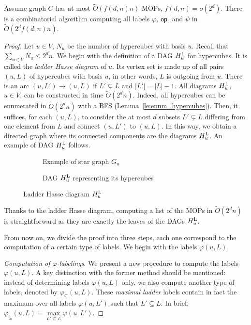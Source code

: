 \documentclass[a4paper,UKenglish,numberwithinsect,cleveref, autoref]{lipics-v2021}
\newcommand{\card}[1]{\left| #1 \right|}
\newcommand{\opp}{\mbox{\textsf{op}}}
\newcommand{\hul}{H_u^{\mbox{\scriptsize{L}}}}
\newcommand{\varphis}{\varphi_{\subseteq}}
\begin{document}
\begin{theorem}
Assume graph $G$ has at most $\tilde{O}(f(d,n)n)$ MOPs, $f(d,n) = o(2^d)$. There is a combinatorial algorithm computing all labels $\varphi$, $\opp$, and $\psi$ in $\tilde{O}(2^df(d,n)n)$.
\label{th:labels_mops}
\end{theorem}
\begin{proof}
Let $u \in V$, $N_u$ be the number of hypercubes with basis $u$. 
Recall that $\sum_{u \in V} N_u \le 2^dn$. We begin with the definition of a DAG $\hul$ for hypercubes. It is called the \textit{ladder Hasse diagram} of $u$. Its vertex set is made up of all pairs $(u,L)$ of hypercubes with basis $u$, in other words, $L$ is outgoing from $u$. There is an arc $(u,L')\rightarrow (u,L)$ if $L' \subsetneq L$ and $\card{L'} = \card{L} - 1$. All diagrams $\hul$, $u \in V$, can be constructed in time $\tilde{O}(2^dn)$. Indeed, all hypercubes can be enumerated in $\tilde{O}(2^dn)$ with a BFS (Lemma~\ref{le:enum_hypercubes}). Then, it suffices, for each $(u,L)$, to consider the at most $d$ subsets $L' \subsetneq L$ differing from one element from $L$ and connect $(u,L')$ to $(u,L)$. In this way, we obtain a directed graph where its connected components are the diagrams $\hul$. An example of DAG $\hul$ follows.

\begin{figure}[h]
\centering
\begin{subfigure}[b]{0.49\columnwidth}
\centering
\scalebox{0.9}{}
\caption{Example of star graph $G_u$}
\label{subfig:two_cubes}
\end{subfigure}
\begin{subfigure}[b]{0.49\columnwidth}
\centering
\scalebox{0.9}{}
\caption{DAG $\hul$ representing its hypercubes}
\label{subfig:hul}
\end{subfigure}

\caption{Ladder Hasse diagram $\hul$}
\label{fig:hul}
\end{figure}

Thanks to the ladder Hasse diagram, computing a list of the MOPs in $\tilde{O}(2^dn)$ is straightforward as they are exactly the leaves of the DAGs $\hul$.

From now on, we divide the proof into three steps, each one correspond to the computation of a certain type of labels. We begin with the labels $\varphi(u,L)$. 

\textit{Computation of $\varphi$-labelings}. 
We present a new procedure to compute the labels $\varphi(u,L)$. A key distinction with the former method should be mentioned: instead of determining labels $\varphi(u,L)$ only, we also compute another type of labels, denoted by $\varphis(u,L)$. These \textit{maximal ladder} labels contain in fact the maximum over all labels $\varphi(u,L')$ such that $L' \subseteq L$. In brief, $\varphis(u,L) = \max\limits_{L' \subseteq L} \varphi(u,L')$.


\end{proof}
\end{document}
